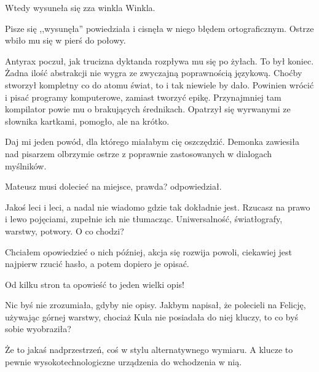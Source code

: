 Wtedy wysuneła się zza winkla Winkla. 

\ds{} Pisze się ,,wysunęła'' \dm{} powiedziała i cisnęła w niego błędem ortograficznym. Ostrze wbiło mu się w pierś do połowy. \de{}

Antyrax poczuł, jak trucizna dyktanda rozpływa mu się po żyłach. To był koniec. Żadna ilość abstrakcji nie wygra ze zwyczajną poprawnością językową.
Choćby stworzył kompletny co do atomu świat, to i tak niewiele by dało. 
Powinien wrócić i pisać programy komputerowe, zamiast tworzyć epikę. Przynajmniej tam kompilator powie mu o brakujących średnikach.
Opatrzył się wyrwanymi ze słownika kartkami, pomogło, ale na krótko.

\ds{} Daj mi jeden powód, dla którego miałabym cię oszczędzić. \dm{} Demonka zawiesiła nad pisarzem olbrzymie ostrze z poprawnie zastosowanych w dialogach myślników. \de{}

\ds{} Mateusz musi dolecieć na miejsce, prawda? \dm{} odpowiedział. \de{}

\ds{} Jakoś leci i leci, a nadal nie wiadomo gdzie tak dokładnie jest. Rzucasz na prawo i lewo pojęciami, zupełnie ich nie tłumacząc.
Uniwersalność, światłografy, warstwy, potwory. O co chodzi? \de{}

\ds{} Chciałem opowiedzieć o nich później, akcja się rozwija powoli, ciekawiej jest najpierw rzucić hasło, a potem dopiero je opisać. \de{}

\ds{} Od kilku stron ta opowieść to jeden wielki opis! \de{}

\ds{} Nic byś nie zrozumiała, gdyby nie opisy. Jakbym napisał, że polecieli na Felicję, używając górnej warstwy, chociaż Kula nie posiadała do niej kluczy, to co byś sobie wyobraziła? \de{}

\ds{} Że to jakaś nadprzestrzeń, coś w stylu alternatywnego wymiaru. A klucze to pewnie wysokotechnologiczne urządzenia do wchodzenia w nią. \de{}

